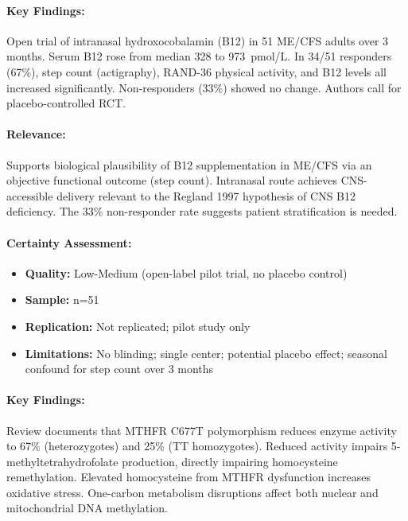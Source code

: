 \bigskip


\paragraph{Key Findings:}
Open trial of intranasal hydroxocobalamin (B12) in 51 ME/CFS adults over 3 months. Serum B12 rose
from median 328 to 973~pmol/L. In 34/51 responders (67\%), step count (actigraphy), RAND-36
physical activity, and B12 levels all increased significantly. Non-responders (33\%) showed no
change. Authors call for placebo-controlled RCT.

\paragraph{Relevance:}
Supports biological plausibility of B12 supplementation in ME/CFS via an objective functional
outcome (step count). Intranasal route achieves CNS-accessible delivery relevant to the Regland 1997
hypothesis of CNS B12 deficiency. The 33\% non-responder rate suggests patient stratification is
needed.

\paragraph{Certainty Assessment:}
\begin{itemize}
  \item \textbf{Quality:} Low-Medium (open-label pilot trial, no placebo control)
  \item \textbf{Sample:} n=51
  \item \textbf{Replication:} Not replicated; pilot study only
  \item \textbf{Limitations:} No blinding; single center; potential placebo effect;
    seasonal confound for step count over 3 months
\end{itemize}

\bigskip


\paragraph{Key Findings:}
Review documents that MTHFR C677T polymorphism reduces enzyme activity to 67\% (heterozygotes) and
25\% (TT homozygotes). Reduced activity impairs 5-methyltetrahydrofolate production, directly
impairing homocysteine remethylation. Elevated homocysteine from MTHFR dysfunction increases
oxidative stress. One-carbon metabolism disruptions affect both nuclear and mitochondrial DNA
methylation.

